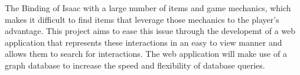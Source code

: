 The Binding of Isaac with a large number of items and game mechanics, which makes it difficult to 
find items that leverage those mechanics to the player's advantage.
This project aims to ease this issue through the developemt of a web application that represents these 
interactions in an easy to view manner and allows them to search for interactions. The web application 
will make use of a graph database to increase the speed and flexibility of database queries.
